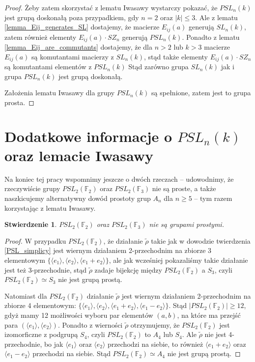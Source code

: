 \documentclass[licencjacka]{pracamgr}
\newtheorem{fact}{Stwierdzenie}[section]
\begin{document}
\begin{proof}
  Żeby zatem skorzystać z lematu Iwasawy wystarczy pokazać, że $PSL_n(k)$ jest grupą doskonałą 
  poza przypadkiem, gdy $n = 2$ oraz $|k| \le 3$.
  Ale z lematu \ref{lemma_Eij_generates_SL} dostajemy, że macierze $E_{i j}(a)$ generują $SL_n(k)$,
  zatem również elementy $E_{i j}(a) \cdot SZ_n$ generują $PSL_n(k)$.
  Ponadto z lematu \ref{lemma_Eij_are_commutants} dostajemy, że dla $n > 2$ lub $k > 3$ macierze $E_{i j}(a)$ 
  są komutantami macierzy z $SL_n(k)$, stąd także elementy $E_{i j}(a) \cdot SZ_n$ są komutantami elementów z $PSL_n(k)$
  Stąd zarówno grupa $SL_n(k)$ jak i grupa $PSL_n(k)$ jest grupą doskonałą.
  
  Założenia lematu Iwasawy dla grupy $PSL_n(k)$ są spełnione, zatem jest to grupa prosta.
\end{proof}

\section{Dodatkowe informacje o $PSL_n(k)$ oraz lemacie Iwasawy}

Na koniec tej pracy wspomnimy jeszcze o dwóch rzeczach -- udowodnimy, że rzeczywiście 
grupy $PSL_2(\mathbb{F}_2)$ oraz $PSL_2(\mathbb{F}_3)$ nie są proste,
a także naszkicujemy alternatywny dowód prostoty grup $A_n$ dla $n \ge 5$ -- tym razem korzystając z lematu Iwasawy.

\begin{fact}
  $PSL_2(\mathbb{F}_2)$ oraz $PSL_2(\mathbb{F}_3)$ nie są grupami prostymi.
\end{fact}
\begin{proof}
W przypadku $PSL_2(\mathbb{F}_2)$, że działanie $\tilde{\rho}$ takie jak w dowodzie twierdzenia \ref{PSL_simplicy}
jest wiernym działaniem 2-przechodnim na zbiorze 3 elementowym $\{ \langle e_1 \rangle, \langle e_2 \rangle, \langle e_1 + e_2 \rangle\}$,
ale jak wcześniej pokazaliśmy takie działanie jest też 3-przechodnie, stąd $\tilde{\rho}$ zadaje bijekcję między $PSL_2(\mathbb{F}_2)$
a $S_3$, czyli $PSL_2(\mathbb{F}_2) \simeq S_3$ nie jest grupą prostą.

Natomiast dla $PSL_2(\mathbb{F}_2)$ działanie $\tilde{\rho}$
jest wiernym działaniem 2-przechodnim na zbiorze 4 elementowym: 
$\{ \langle e_1 \rangle, \langle e_2 \rangle, \langle e_1 + e_2 \rangle, \langle e_1 - e_2 \rangle \}$.
Stąd $| PSL_2(\mathbb{F}_2) | \ge 12$, gdyż mamy 12 możliwości wyboru par elementów $(a, b)$, 
na które ma przejść para $(\langle e_1 \rangle, \langle e_2 \rangle)$.
Ponadto z wierności $\tilde{\rho}$ otrzymujemy, że $PSL_2(\mathbb{F}_2)$ jest izomorficzne z podgrupą $S_4$,
czyli $PSL_2(\mathbb{F}_2)$ to $A_4$ lub $S_4$.
Ale $\tilde{\rho}$ nie jest 4-przechodnie, bo jak $\langle e_1 \rangle$ oraz $\langle e_2 \rangle$ przechodzi na siebie,
to również $\langle e_1 + e_2 \rangle$ oraz $\langle e_1 - e_2 \rangle$ przechodzi na siebie.
Stąd $PSL_2(\mathbb{F}_2) \simeq A_4$ nie jest grupą prostą.
\end{proof}
\end{document}
